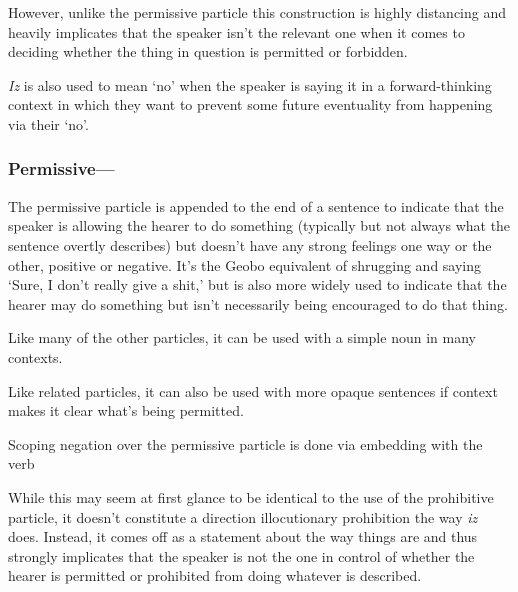 \documentclass[a4paper,11pt,oneside,openany]{memoir}
\begin{document}
However, unlike the permissive particle %
 this construction is highly distancing and heavily implicates that the speaker isn't the relevant one when it comes to deciding whether the thing in question is permitted or forbidden.

\textit{Iz} is also used to mean `no' when the speaker is saying it in a forward-thinking context in which they want to prevent some future eventuality from happening via their `no'.

\subsubsection{Permissive---} 

The permissive particle %
is appended to the end of a sentence to indicate that the speaker is allowing the hearer to do something (typically but not always what the sentence overtly describes) but doesn't have any strong feelings one way or the other, positive or negative. It's the Geobo{\engma} equivalent of shrugging and saying `Sure, I don't really give a shit,' but is also more widely used to indicate that the hearer may do something but isn't necessarily being encouraged to do that thing.


Like many of the other particles, it can be used with a simple noun in many contexts.


Like related particles, it can also be used with more opaque sentences if context makes it clear what's being permitted. 

Scoping negation over the permissive particle is done via embedding with the verb 


While this may seem at first glance to be identical to the use of the prohibitive particle, it doesn't constitute a direction illocutionary prohibition the way \textit{iz} does. Instead, it comes off as a statement about the way things are and thus strongly implicates that the speaker is not the one in control of whether the hearer is permitted or prohibited from doing whatever is described.
\end{document}
